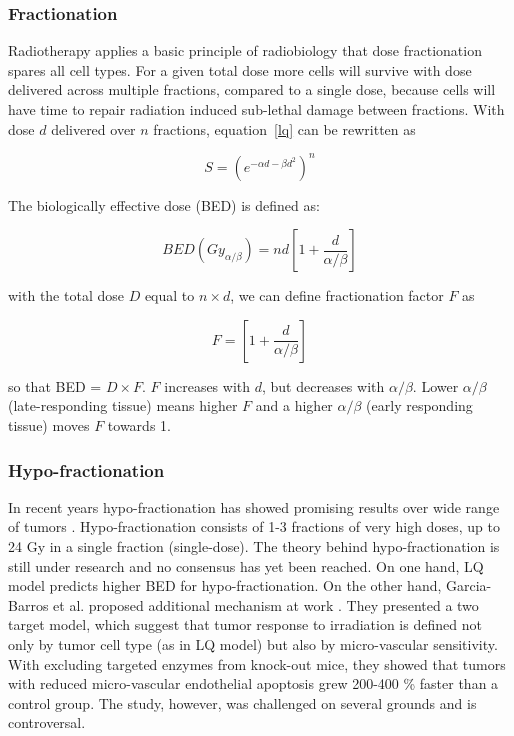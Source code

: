 \subsubsection{Fractionation}

Radiotherapy applies a basic principle of radiobiology that dose fractionation spares all cell types. For a given total dose
more cells will survive with dose delivered across multiple fractions, compared to a single dose, because cells will have time to repair
radiation induced sub-lethal damage between fractions.
With dose $d$ delivered over $n$ fractions, equation~\ref{lq} can be rewritten as \cite{Shrieve2011}

\begin{equation}
 S = (e^{-\alpha d - \beta d^2})^n
\end{equation}

The biologically effective dose (BED) is defined as:

\begin{equation}
 BED(Gy_{\alpha/\beta})=nd\left[1 + \frac{d}{\alpha/\beta} \right]
\end{equation}

with the total dose $D$ equal to $n \times d$, we can define fractionation factor $F$ as

\begin{equation}
 F = \left[1 + \frac{d}{\alpha / \beta} \right]
\end{equation}

so that BED = $D \times F$. $F$ increases with $d$, but decreases with $\alpha / \beta$. Lower $\alpha / \beta$ (late-responding tissue)
means higher $F$ and a higher $\alpha / \beta$ (early responding tissue) moves $F$ towards 1.


\subsubsection{Hypo-fractionation}

In recent years hypo-fractionation has showed promising results over wide range of tumors \cite{Yamada2008, Greco2011, Halasz2013}. 
Hypo-fractionation consists of 1-3 fractions of very high doses, up to 24 Gy in a single fraction (single-dose). The theory behind hypo-fractionation is still under research
and no consensus has yet been reached. On one hand, LQ model predicts higher BED for hypo-fractionation. On the other hand, Garcia-Barros et al. proposed additional mechanism at work \cite{Garcia2003}.
They presented a two target model, which suggest that tumor response to irradiation is defined not only by tumor cell type (as in LQ model) but also by micro-vascular
sensitivity. With excluding targeted enzymes from knock-out mice, they showed that tumors with reduced micro-vascular endothelial apoptosis grew 200-400 \% faster than a control group. The study, however, was challenged on several grounds and is controversal.
  

